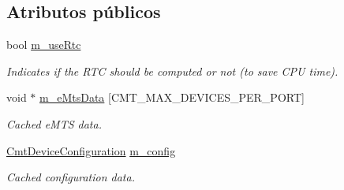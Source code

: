 \subsection*{\-Atributos públicos}
\begin{DoxyCompactItemize}
\item 
\hypertarget{classxsens_1_1Cmt3_a73c250dc7d52fa021473135ab2863869}{bool \hyperlink{classxsens_1_1Cmt3_a73c250dc7d52fa021473135ab2863869}{m\-\_\-use\-Rtc}}\label{classxsens_1_1Cmt3_a73c250dc7d52fa021473135ab2863869}

\begin{DoxyCompactList}\small\item\em \-Indicates if the \-R\-T\-C should be computed or not (to save \-C\-P\-U time). \end{DoxyCompactList}\item 
\hypertarget{classxsens_1_1Cmt3_a69471cff8af8f0ea6365ec9a23ab5d6e}{void $\ast$ \hyperlink{classxsens_1_1Cmt3_a69471cff8af8f0ea6365ec9a23ab5d6e}{m\-\_\-e\-Mts\-Data} \mbox{[}\-C\-M\-T\-\_\-\-M\-A\-X\-\_\-\-D\-E\-V\-I\-C\-E\-S\-\_\-\-P\-E\-R\-\_\-\-P\-O\-R\-T\mbox{]}}\label{classxsens_1_1Cmt3_a69471cff8af8f0ea6365ec9a23ab5d6e}

\begin{DoxyCompactList}\small\item\em \-Cached e\-M\-T\-S data. \end{DoxyCompactList}\item 
\hypertarget{classxsens_1_1Cmt3_a1f65b2ecc06607fa01c7f90beb6e1e04}{\hyperlink{structCmtDeviceConfiguration}{\-Cmt\-Device\-Configuration} \hyperlink{classxsens_1_1Cmt3_a1f65b2ecc06607fa01c7f90beb6e1e04}{m\-\_\-config}}\label{classxsens_1_1Cmt3_a1f65b2ecc06607fa01c7f90beb6e1e04}

\begin{DoxyCompactList}\small\item\em \-Cached configuration data. \end{DoxyCompactList}\end{DoxyCompactItemize}
